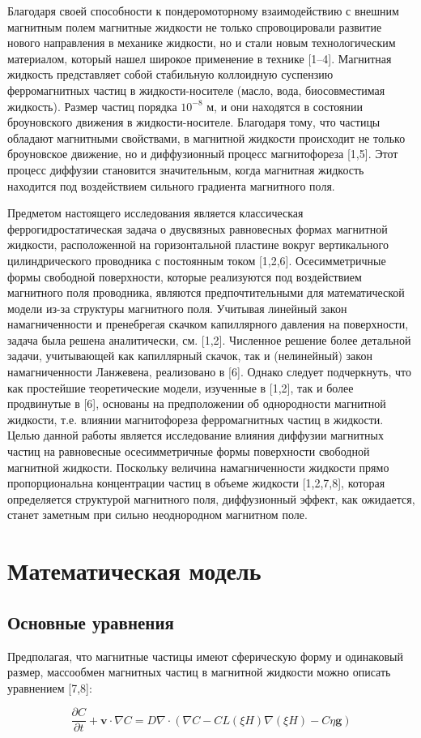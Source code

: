 \documentclass[12pt]{article}
\begin{document}
    Благодаря своей способности к пондеромоторному взаимодействию с внешним магнитным полем магнитные 
    жидкости не только спровоцировали развитие нового направления в механике жидкости, но и стали новым 
    технологическим материалом, который нашел широкое применение в технике [1–4]. Магнитная жидкость 
    представляет собой стабильную коллоидную суспензию ферромагнитных частиц в жидкости-носителе 
    (масло, вода, биосовместимая жидкость). Размер частиц порядка $ 10^{-8} $ м, и они находятся в состоянии 
    броуновского движения в жидкости-носителе. Благодаря тому, что частицы обладают магнитными свойствами, 
    в магнитной жидкости происходит не только броуновское движение, но и диффузионный процесс 
    магнитофореза [1,5]. Этот процесс диффузии становится значительным, когда магнитная жидкость находится 
    под воздействием сильного градиента магнитного поля. 
    \par
    Предметом настоящего исследования является классическая феррогидростатическая задача о двусвязных 
    равновесных формах магнитной жидкости, расположенной на горизонтальной пластине вокруг вертикального 
    цилиндрического проводника с постоянным током [1,2,6]. Осесимметричные формы свободной поверхности, 
    которые реализуются под воздействием магнитного поля проводника, являются предпочтительными для 
    математической модели из-за структуры магнитного поля. Учитывая линейный закон намагниченности и 
    пренебрегая скачком капиллярного давления на поверхности, задача была решена аналитически, см. [1,2]. 
    Численное решение более детальной задачи, учитывающей как капиллярный скачок, так и (нелинейный) 
    закон намагниченности Ланжевена, реализовано в [6]. Однако следует подчеркнуть, что как простейшие 
    теоретические модели, изученные в [1,2], так и более продвинутые в [6], основаны на предположении 
    об однородности магнитной жидкости, т.е. влиянии магнитофореза ферромагнитных частиц в жидкости. 
    Целью данной работы является исследование влияния диффузии магнитных частиц на равновесные осесимметричные 
    формы поверхности свободной магнитной жидкости. Поскольку величина намагниченности жидкости прямо 
    пропорциональна концентрации частиц в объеме жидкости [1,2,7,8], которая определяется структурой 
    магнитного поля, диффузионный эффект, как ожидается, станет заметным при сильно неоднородном магнитном поле.

\section{Математическая модель}

\subsection{Основные уравнения}

    Предполагая, что магнитные частицы имеют сферическую форму и одинаковый размер, массообмен магнитных частиц 
    в магнитной жидкости можно описать уравнением [7,8]:

    \begin{equation}
        \frac{\partial C}{\partial t} + \mathbf{v} \cdot \nabla C = D \nabla \cdot (\nabla C - CL(\xi H) \nabla (\xi H) - C \eta \mathbf{g})
    \end{equation}
\end{document}
